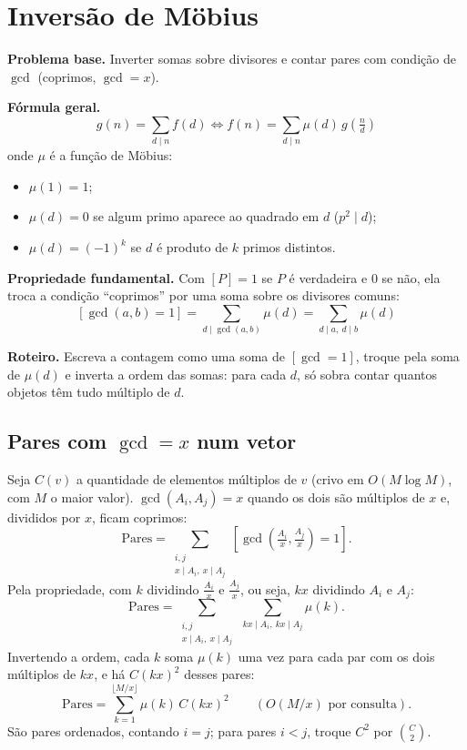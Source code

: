 \section{Inversão de Möbius}

\textbf{Problema base.} Inverter somas sobre divisores e contar pares com condição de $\gcd$ (coprimos, $\gcd = x$).

\textbf{Fórmula geral.}
\[
\boxed{g(n) = \sum_{d \mid n} f(d) \iff f(n) = \sum_{d \mid n} \mu(d)\, g\!\left(\tfrac{n}{d}\right)}
\]
onde $\mu$ é a função de Möbius:
\begin{itemize}
  \item $\mu(1) = 1$;
  \item $\mu(d) = 0$ se algum primo aparece ao quadrado em $d$ ($p^2 \mid d$);
  \item $\mu(d) = (-1)^k$ se $d$ é produto de $k$ primos distintos.
\end{itemize}

\textbf{Propriedade fundamental.} Com $[P] = 1$ se $P$ é verdadeira e $0$ se não, ela troca a condição ``coprimos'' por
uma soma sobre os divisores comuns:
\[
[\gcd(a, b) = 1] = \sum_{d \mid \gcd(a, b)} \mu(d) = \sum_{d \mid a,\ d \mid b} \mu(d)
\]

\textbf{Roteiro.} Escreva a contagem como uma soma de $[\gcd = 1]$, troque pela soma de $\mu(d)$ e inverta a ordem das
somas: para cada $d$, só sobra contar quantos objetos têm tudo múltiplo de $d$.

\subsection*{Pares com $\gcd = x$ num vetor}

Seja $C(v)$ a quantidade de elementos múltiplos de $v$ (crivo em $O(M \log M)$, com $M$ o maior valor).
$\gcd(A_i, A_j) = x$ quando os dois são múltiplos de $x$ e, divididos por $x$, ficam coprimos:
\[ \text{Pares} = \sum_{\substack{i, j \\ x \mid A_i,\ x \mid A_j}} \left[\gcd\!\left(\tfrac{A_i}{x}, \tfrac{A_j}{x}\right) = 1\right]. \]
Pela propriedade, com $k$ dividindo $\frac{A_i}{x}$ e $\frac{A_j}{x}$, ou seja, $kx$ dividindo $A_i$ e $A_j$:
\[ \text{Pares} = \sum_{\substack{i, j \\ x \mid A_i,\ x \mid A_j}} \ \sum_{kx \mid A_i,\ kx \mid A_j} \mu(k). \]
Invertendo a ordem, cada $k$ soma $\mu(k)$ uma vez para cada par com os dois múltiplos de $kx$, e há $C(kx)^2$ desses pares:
\[ \text{Pares} = \sum_{k=1}^{\lfloor M/x \rfloor} \mu(k)\, C(kx)^2 \qquad (O(M/x) \text{ por consulta}). \]
São pares ordenados, contando $i = j$; para pares $i < j$, troque $C^2$ por $\binom{C}{2}$.


